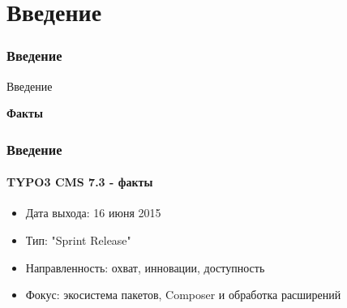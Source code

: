 %

\section{Введение}
\begin{frame}[fragile]
	\frametitle{Введение}

	\begin{center}\huge{Введение}\end{center}
	\begin{center}\huge{\color{typo3darkgrey}\textbf{Факты}}\end{center}

\end{frame}

\begin{frame}[fragile]
	\frametitle{Введение}
	\framesubtitle{TYPO3 CMS 7.3 - факты}

	\begin{itemize}
		\item Дата выхода: 16 июня 2015
		\item Тип: "Sprint Release"
		\item Направленность: охват, инновации, доступность
		\item Фокус: экосистема пакетов, Composer и обработка расширений
	\end{itemize}

\end{frame}


